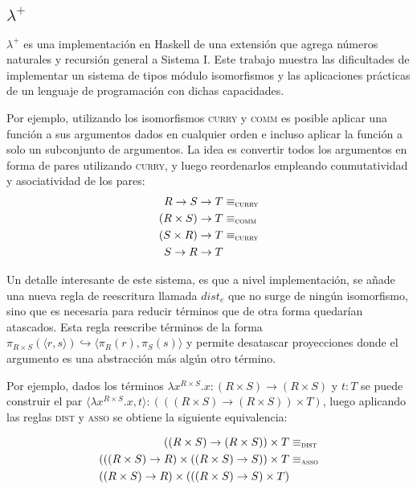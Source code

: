 \subsection{$\lambda^+$}
$\lambda^+$ \cite{lambda-plus} es una implementación en Haskell de una extensión que agrega números naturales y recursión general a Sistema I.
Este trabajo muestra las dificultades de implementar un sistema de tipos módulo isomorfismos y las aplicaciones prácticas de un lenguaje de programación con dichas capacidades.

Por ejemplo, utilizando los isomorfismos \textsc{curry} y \textsc{comm} es posible aplicar una función a sus argumentos dados en cualquier orden e incluso aplicar la función a solo un subconjunto de  argumentos.
La idea es convertir todos los argumentos en forma de pares utilizando \textsc{curry}, y luego reordenarlos empleando conmutatividad y asociatividad de los pares:
\begin{align*}
	R \rightarrow S \rightarrow T& \equiv_\textsc{curry} \\
	(R \times S) \rightarrow T& \equiv_\textsc{comm} \\
	(S \times R) \rightarrow T& \equiv_\textsc{curry} \\
	S \rightarrow R \rightarrow T& 
\end{align*}

Un detalle interesante de este sistema, es que a nivel implementación, se añade una nueva regla de reescritura llamada $dist_e$ que no surge de ningún isomorfismo, sino que es necesaria para reducir términos que de otra forma quedarían atascados.
Esta regla reescribe términos de la forma
$\pi_{R \times S}(\langle r,s \rangle) \hookrightarrow \langle \pi_R(r), \pi_S(s) \rangle$
y permite desatascar proyecciones donde el argumento es una abstracción más algún otro término.

Por ejemplo, dados los términos $\lambda x^{R \times S}.x: (R \times S) \rightarrow (R \times S)$ y $t : T$ se puede construir el par $\langle \lambda x^{R \times S}.x, t \rangle: (((R \times S) \rightarrow (R \times S)) \times T)$, luego aplicando las reglas \textsc{dist} y \textsc{asso} se obtiene la siguiente equivalencia:

\begin{align*}
	((R \times S) \rightarrow (R \times S)) \times T& \equiv_\textsc{dist} \\
	(((R \times S) \rightarrow R) \times ((R \times S) \rightarrow S)) \times T& \equiv_\textsc{asso} \\
	((R \times S) \rightarrow R) \times (((R \times S) \rightarrow S) \times T)& 
\end{align*}

